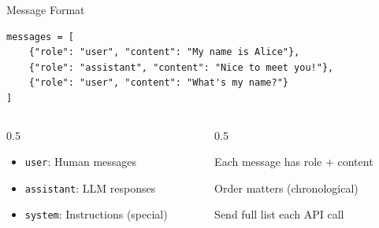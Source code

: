 \documentclass[aspectratio=169]{beamer}
\begin{document}
\begin{frame}[fragile]{Message Format}
\begin{shadedbox}[title=\textbf{Messages Are a List of Dictionaries}]
\begin{verbatim}
messages = [
    {"role": "user", "content": "My name is Alice"},
    {"role": "assistant", "content": "Nice to meet you!"},
    {"role": "user", "content": "What's my name?"}
]
\end{verbatim}
\end{shadedbox}
\vspace{0.3cm}
\begin{columns}[T]
\begin{column}{0.5\textwidth}
\begin{shadedbox}[title=\textbf{Roles}]
\begin{itemize}\small
  \item \texttt{user}: Human messages
  \item \texttt{assistant}: LLM responses
  \item \texttt{system}: Instructions (special)
\end{itemize}
\end{shadedbox}
\end{column}
\begin{column}{0.5\textwidth}
\begin{baritemize}\small
  \item Each message has role + content
  \item Order matters (chronological)
  \item Send full list each API call
\end{baritemize}
\end{column}
\end{columns}
\end{frame}
\end{document}
